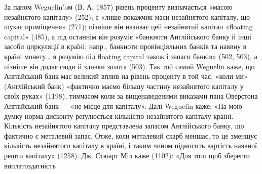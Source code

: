 За паном Weguelin’oм (В. А. 1857) рівень проценту визначається «масою
незайнятого капіталу» (252); є «лише покажчик маси незайнятого капіталу, що
шукає приміщення» (271); пізніше він називає цей незайнятий капітал «floating
capital» (485), а під останнім він розуміє «банкноти Англійського банку й інші
засоби циркуляції в країні; напр., банкноти провінціяльних банків та наявну в
країні монету\dots{} я розумію під floating capital також і запаси банків» (502, 503),
а пізніше він додає сюди й зливки золота (503). Так той самий Weguelin каже, що
Англійський банк має великий вплив на рівень проценту в той час, «коли ми» (Англійський
банк) «фактично маємо більшу частину незайнятого капіталу у своїх
руках» (1198), тимчасом коли за вищенаведеними виказами пана Оверстона Англійський
банк — «не місце для капіталу». Далі Weguelin каже: «На мою думку
норма дисконту реґулюється кількістю незайнятого капіталу країні. Кількість незайнятого
капіталу представлена запасом Англійського банку, що фактично є металевий
запас. Отже, коли металевий скарб меншає, то це зменшує кількість незайнятого
капіталу в країні, і таким чином підносить вартість наявної решти капіталу»
(1258). Дж. Стюарт Міл каже (1102): «Для того щоб зберегти виплатоздатність
\parbreak{}  %
